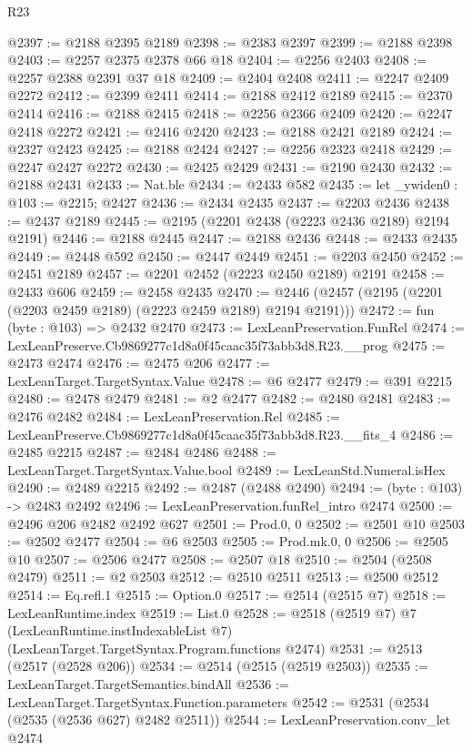 \begin{lexlean}{R23}
\begin{coremodule}
@2397 := @2188 @2395 @2189
@2398 := @2383 @2397
@2399 := @2188 @2398
@2403 := @2257 @2375 @2378 @66 @18
@2404 := @2256 @2403
@2408 := @2257 @2388 @2391 @37 @18
@2409 := @2404 @2408
@2411 := @2247 @2409 @2272
@2412 := @2399 @2411
@2414 := @2188 @2412 @2189
@2415 := @2370 @2414
@2416 := @2188 @2415
@2418 := @2256 @2366 @2409
@2420 := @2247 @2418 @2272
@2421 := @2416 @2420
@2423 := @2188 @2421 @2189
@2424 := @2327 @2423
@2425 := @2188 @2424
@2427 := @2256 @2323 @2418
@2429 := @2247 @2427 @2272
@2430 := @2425 @2429
@2431 := @2190 @2430
@2432 := @2188 @2431
@2433 := Nat.ble
@2434 := @2433 @582
@2435 := let _ywiden0 : @103 := @2215; @2427
@2436 := @2434 @2435
@2437 := @2203 @2436
@2438 := @2437 @2189
@2445 := @2195 (@2201 @2438 (@2223 @2436 @2189) @2194 @2191)
@2446 := @2188 @2445
@2447 := @2188 @2436
@2448 := @2433 @2435
@2449 := @2448 @592
@2450 := @2447 @2449
@2451 := @2203 @2450
@2452 := @2451 @2189
@2457 := @2201 @2452 (@2223 @2450 @2189) @2191
@2458 := @2433 @606
@2459 := @2458 @2435
@2470 := @2446 (@2457 (@2195 (@2201 (@2203 @2459 @2189) (@2223 @2459 @2189) @2194 @2191)))
@2472 := fun (byte : @103) => @2432 @2470
@2473 := LexLeanPreservation.FunRel
@2474 := LexLeanPreserve.Cb9869277c1d8a0f45caac35f73abb3d8.R23.__prog
@2475 := @2473 @2474
@2476 := @2475 @206
@2477 := LexLeanTarget.TargetSyntax.Value
@2478 := @6 @2477
@2479 := @391 @2215
@2480 := @2478 @2479
@2481 := @2 @2477
@2482 := @2480 @2481
@2483 := @2476 @2482
@2484 := LexLeanPreservation.Rel
@2485 := LexLeanPreserve.Cb9869277c1d8a0f45caac35f73abb3d8.R23.__fits_4
@2486 := @2485 @2215
@2487 := @2484 @2486
@2488 := LexLeanTarget.TargetSyntax.Value.bool
@2489 := LexLeanStd.Numeral.isHex
@2490 := @2489 @2215
@2492 := @2487 (@2488 @2490)
@2494 := (byte : @103) -> @2483 @2492
@2496 := LexLeanPreservation.funRel_intro @2474
@2500 := @2496 @206 @2482 @2492 @627
@2501 := Prod.{0, 0}
@2502 := @2501 @10
@2503 := @2502 @2477
@2504 := @6 @2503
@2505 := Prod.mk.{0, 0}
@2506 := @2505 @10
@2507 := @2506 @2477
@2508 := @2507 @18
@2510 := @2504 (@2508 @2479)
@2511 := @2 @2503
@2512 := @2510 @2511
@2513 := @2500 @2512
@2514 := Eq.refl.{1}
@2515 := Option.{0}
@2517 := @2514 (@2515 @7)
@2518 := LexLeanRuntime.index
@2519 := List.{0}
@2528 := @2518
    (@2519 @7)
    @7
    (LexLeanRuntime.instIndexableList @7)
    (LexLeanTarget.TargetSyntax.Program.functions @2474)
@2531 := @2513 (@2517 (@2528 @206))
@2534 := @2514 (@2515 (@2519 @2503))
@2535 := LexLeanTarget.TargetSemantics.bindAll
@2536 := LexLeanTarget.TargetSyntax.Function.parameters
@2542 := @2531 (@2534 (@2535 (@2536 @627) @2482 @2511))
@2544 := LexLeanPreservation.conv_let @2474

\end{coremodule}
\end{lexlean}
